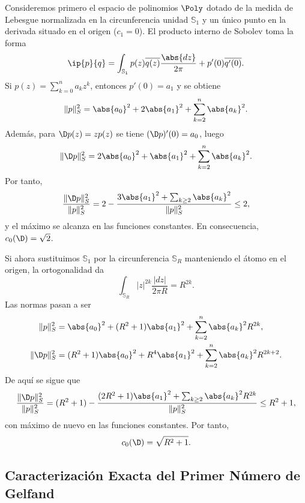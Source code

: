 \begin{exm}
	Consideremos primero el espacio de polinomios $\Poly$ dotado de la medida de Lebesgue normalizada en la circunferencia unidad $\mathbb{S}_1$ y un único punto en la derivada situado en el origen ($c_1 = 0$). El producto interno de Sobolev toma la forma
	\begin{equation}
		\ip{p}{q} = \int_{\mathbb{S}_1} p(z)\overline{q(z)} \frac{\abs{dz}}{2\pi} + p'(0)\overline{q'(0)}.
	\end{equation}
	Si $p(z) = \sum_{k=0}^n a_k z^k$, entonces $p'(0) = a_1$ y se obtiene
	\begin{equation} \label{eq:norma_in_0}
		\|p\|_S^2 = \abs{a_0}^2 + 2\abs{a_1}^2 + \sum_{k=2}^n \abs{a_k}^2.
	\end{equation}
	Además, para $\D p(z) = z p(z)$ se tiene $(\D p)'(0) = a_0$, luego
	\begin{equation} \label{eq:norma_out_0}
		\|\D p\|_S^2 = 2\abs{a_0}^2 + \abs{a_1}^2 + \sum_{k=2}^n \abs{a_k}^2.
	\end{equation}
	Por tanto,
	\begin{equation}
		\frac{\|\D p\|_S^2}{\|p\|_S^2} = 2 - \frac{3\abs{a_1}^2 + \sum_{k \ge 2} \abs{a_k}^2}{\|p\|_S^2} \le 2,
	\end{equation}
	y el máximo se alcanza en las funciones constantes. En consecuencia, $c_0(\D) = \sqrt{2}$.

	Si ahora sustituimos $\mathbb{S}_1$ por la circunferencia $\mathbb{S}_R$ manteniendo el átomo en el origen, la ortogonalidad da
	\[\int_{\mathbb{S}_R} |z|^{2k} \frac{|dz|}{2\pi R} = R^{2k}.\]
	Las normas pasan a ser
	\begin{align}
		\|p\|_S^2    & = \abs{a_0}^2 + (R^2 + 1)\abs{a_1}^2 + \sum_{k=2}^n \abs{a_k}^2 R^{2k}, \label{eq:norma_in_0_R}       \\
		\|\D p\|_S^2 & = (R^2 + 1)\abs{a_0}^2 + R^4\abs{a_1}^2 + \sum_{k=2}^n \abs{a_k}^2 R^{2k+2}. \label{eq:norma_out_0_R}
	\end{align}
	De aquí se sigue que
	\begin{equation}
		\frac{\|\D p\|_S^2}{\|p\|_S^2} = (R^2 + 1) - \frac{(2R^2 + 1)\abs{a_1}^2 + \sum_{k \ge 2} \abs{a_k}^2 R^{2k}}{\|p\|_S^2} \le R^2 + 1,
	\end{equation}
	con máximo de nuevo en las funciones constantes. Por tanto,
	\[
		c_0(\D) = \sqrt{R^2 + 1}.
	\]
\end{exm}

\subsection{Caracterización Exacta del Primer Número de Gelfand}


